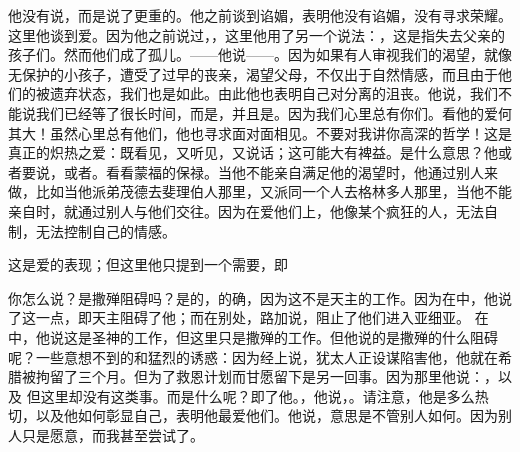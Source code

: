  \par

他没有说，而是说了更重的。他之前谈到谄媚，表明他没有谄媚，没有寻求荣耀。这里他谈到爱。因为他之前说过，，这里他用了另一个说法：，这是指失去父亲的孩子们。然而他们成了孤儿。——他说——。因为如果有人审视我们的渴望，就像无保护的小孩子，遭受了过早的丧亲，渴望父母，不仅出于自然情感，而且由于他们的被遗弃状态，我们也是如此。由此他也表明自己对分离的沮丧。他说，我们不能说我们已经等了很长时间，而是，并且是。因为我们心里总有你们。看他的爱何其大！虽然心里总有他们，他也寻求面对面相见。不要对我讲你高深的哲学！这是真正的炽热之爱：既看见，又听见，又说话；这可能大有裨益。是什么意思？他或者要说，或者。看看蒙福的保禄。当他不能亲自满足他的渴望时，他通过别人来做，比如当他派弟茂德去斐理伯人那里，又派同一个人去格林多人那里，当他不能亲自时，就通过别人与他们交往。因为在爱他们上，他像某个疯狂的人，无法自制，无法控制自己的情感。\par

 \par

这是爱的表现；但这里他只提到一个需要，即 \par

你怎么说？是撒殚阻碍吗？是的，的确，因为这不是天主的工作。因为在中，他说了这一点，即天主阻碍了他；而在别处，路加说，阻止了他们进入亚细亚。 在中，他说这是圣神的工作，但这里只是撒殚的工作。但他说的是撒殚的什么阻碍呢？一些意想不到的和猛烈的诱惑：因为经上说，犹太人正设谋陷害他，他就在希腊被拘留了三个月。但为了救恩计划而甘愿留下是另一回事。因为那里他说：，以及 但这里却没有这类事。而是什么呢？即了他。，他说，。请注意，他是多么热切，以及他如何彰显自己，表明他最爱他们。他说，意思是不管别人如何。因为别人只是愿意，而我甚至尝试了。\par

